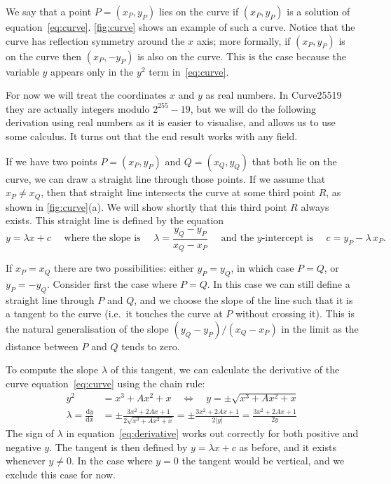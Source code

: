 \documentclass{article}
\begin{document}
We say that a point $P = (x_P, y_P)$ lies on the curve if $(x_P, y_P)$ is a solution of equation~\eqref{eq:curve}.
\autoref{fig:curve} shows an example of such a curve.
Notice that the curve has reflection symmetry around the $x$ axis; more formally, if $(x_P, y_P)$ is on the curve then $(x_P, -y_P)$ is also on the curve.
This is the case because the variable $y$ appears only in the $y^2$ term in~\eqref{eq:curve}.

For now we will treat the coordinates $x$ and $y$ as real numbers.
In Curve25519 they are actually integers modulo $2^{255} - 19$, but we will do the following derivation using real numbers as it is easier to visualise, and allows us to use some calculus.
It turns out that the end result works with any field.

If we have two points $P=(x_P,y_P)$ and $Q=(x_Q,y_Q)$ that both lie on the curve, we can draw a straight line through those points.
If we assume that $x_P \neq x_Q$, then that straight line intersects the curve at some third point $R$, as shown in \autoref{fig:curve}(a).
We will show shortly that this third point $R$ always exists.
This straight line is defined by the equation
\begin{equation}
y = \lambda x + c \quad\text{ where the slope is }\quad
\lambda = \frac{y_Q - y_P}{x_Q - x_P} \quad\text{ and the $y$-intercept is }\quad c = y_P - \lambda\,x_P. \label{eq:line}
\end{equation}

If $x_P=x_Q$ there are two possibilities: either $y_P=y_Q$, in which case $P=Q$, or $y_P=-y_Q$.
Consider first the case where $P=Q$.
In this case we can still define a straight line through $P$ and $Q$, and we choose the slope of the line such that it is a tangent to the curve (i.e.\ it touches the curve at $P$ without crossing it).
This is the natural generalisation of the slope $(y_Q - y_P)/(x_Q - x_P)$ in the limit as the distance between $P$ and $Q$ tends to zero.

To compute the slope $\lambda$ of this tangent, we can calculate the derivative of the curve equation~\eqref{eq:curve} using the chain rule:
\begin{align}
y^2 &= x^3 + A x^2 + x \quad\iff\quad y = \pm\sqrt{x^3 + A x^2 + x}\\[5pt]
\lambda = \frac{\mathrm{d}y}{\mathrm{d}x} &= \pm\frac{3x^2 + 2Ax + 1}{2\sqrt{x^3 + Ax^2 + x}}
= \pm\frac{3x^2 + 2Ax + 1}{2|y|}
= \frac{3x^2 + 2Ax + 1}{2y} \label{eq:derivative}
\end{align}
The sign of $\lambda$ in equation~\eqref{eq:derivative} works out correctly for both positive and negative $y$.
The tangent is then defined by $y = \lambda x + c$ as before, and it exists whenever $y \ne 0$.
In the case where $y=0$ the tangent would be vertical, and we exclude this case for now.
\end{document}
